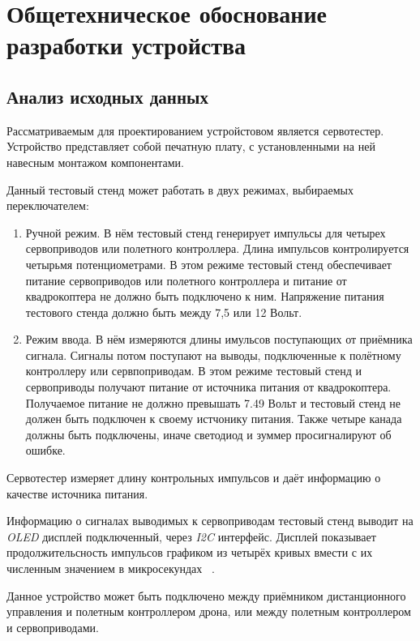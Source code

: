 \section{Общетехническое обоснование разработки устройства}

\subsection{Анализ исходных данных}

Рассматриваемым для проектированием устройстовом является сервотестер.
Устройство представляет собой печатную плату, с установленными на ней
навесным монтажом компонентами.

Данный тестовый стенд может работать в двух режимах, выбираемых переключателем:
\begin{enumerate} 
  
\item Ручной режим. В нём тестовый стенд генерирует импульсы для
четырех сервоприводов или полетного контроллера. Длина импульсов
контролируется четырьмя потенциометрами. В этом режиме тестовый стенд
обеспечивает питание сервоприводов или полетного контроллера и питание
от квадрокоптера не должно быть подключено к ним. Напряжение питания
тестового стенда должно быть между 7,5 или 12 Вольт.
  
\item Режим ввода. В нём измеряются длины имульсов поступающих от
приёмника сигнала. Сигналы потом поступают на выводы, подключенные к
полётному контроллеру или сервпоприводам.  В этом режиме тестовый
стенд и сервоприводы получают питание от источника питания от
квадрокоптера. Получаемое питание не должно превышать 7.49 Вольт и
тестовый стенд не должен быть подключен к своему истчонику
питания. Также четыре канада должны быть подключены, иначе светодиод и
зуммер просигналируют об ошибке.

\end{enumerate}

Сервотестер измеряет длину контрольных импульсов и даёт информацию о
качестве источника питания.


Информацию о сигналах выводимых к сервоприводам тестовый стенд выводит
на \textit{OLED} дисплей подключенный, через \textit{I2C} интерфейс.
Дисплей показывает продолжительсность импульсов графиком из четырёх
кривых вмести с их численным значением в микросекундах
~\cite{Elector521}.

Данное устройство может быть подключено между приёмником
дистанционного управления и полетным контроллером дрона, или между
полетным контроллером и сервоприводами.

